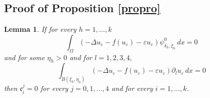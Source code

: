 \documentclass[11pt,a4paper]{amsart}
\newcommand{\e}{\varepsilon}
\renewcommand{\d }{\delta }
\newtheorem{lemma}[theorem]{Lemma}
\theoremstyle{definition}
\renewcommand{\(}{\left(}
\renewcommand{\)}{\right)}
\begin{document}
\subsection{Proof of Proposition \ref{propro}}



\begin{lemma}\label{lemma4.1}
If for every $h=1, \ldots, k$
\begin{equation}\label{cond1}
\int_\Omega \left(-\Delta u_\e -f(u_\e)-\e u_\e\right)\psi^0_{\d_h, \xi_h}\, dx=0
\end{equation}
and for some $\eta_h>0$ and for $l=1,2,3,4,$
\begin{equation}\label{cond2}
\int_{B(\xi_h, \eta_h)} \left(-\Delta u_\e -f(u_\e)-\e u_\e\right)\partial_l u_\e\, dx=0
\end{equation}
then $\mathfrak c^j_i=0$ for every $j=0, 1, \ldots, 4$ and for every $i=1, \ldots, k$.
\end{lemma}
\end{document}
